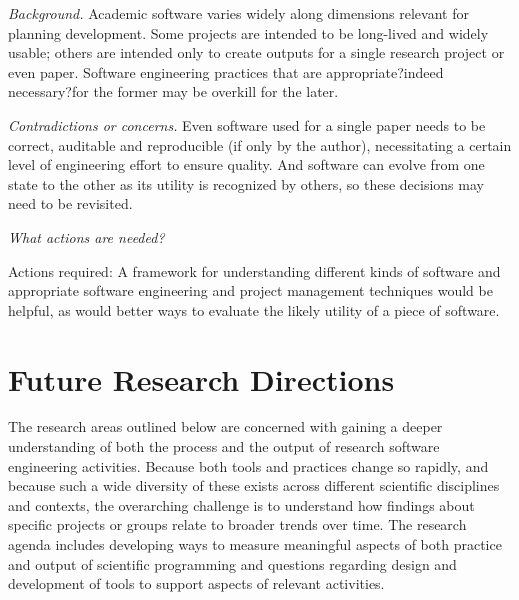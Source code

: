 \documentclass[a4paper,UKenglish]{dagman}
\begin{document}




\emph{Background.} Academic software varies widely along dimensions relevant for planning development. Some projects are intended to be long-lived and widely usable; others are intended only to create outputs for a single research project or even paper. Software engineering practices that are appropriate?indeed necessary?for the former may be overkill for the later. 

\emph{Contradictions or concerns.} Even software used for a single paper needs to be correct, auditable and reproducible (if only by the author), necessitating a certain level of engineering effort to ensure quality. And software can evolve from one state to the other as its utility is recognized by others, so these decisions may need to be revisited. 


\emph{What actions are needed?}




Actions required: A framework for understanding different kinds of software and appropriate software engineering and project management techniques would be helpful, as would better ways to evaluate the likely utility of a piece of software. 



\section{Future Research Directions}

The research areas outlined below are concerned with gaining a deeper understanding of both the process and the output of research software engineering activities. Because both tools and practices change so rapidly, and because such a wide diversity of these exists across different scientific disciplines and contexts, the overarching challenge is to understand how findings about specific projects or groups relate to broader trends over time. The research agenda includes developing ways to measure meaningful aspects of both practice and output of scientific programming and questions regarding design and development of tools to support aspects of relevant activities.
\end{document}
